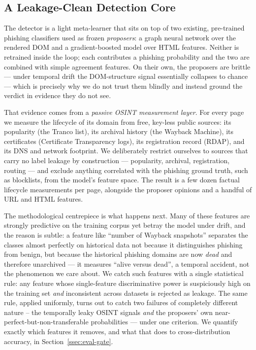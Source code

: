 \subsection{A Leakage-Clean Detection Core}
\label{ssec:core}

The detector is a light meta-learner that sits on top of two existing,
pre-trained phishing classifiers used as frozen \emph{proposers}: a graph
neural network over the rendered DOM and a gradient-boosted model over HTML
features. Neither is retrained inside the loop; each contributes a phishing
probability and the two are combined with simple agreement features. On their
own, the proposers are brittle --- under temporal drift the DOM-structure
signal essentially collapses to chance --- which is precisely why we do not
trust them blindly and instead ground the verdict in evidence they do not see.

That evidence comes from a \emph{passive OSINT measurement layer}. For every
page we measure the lifecycle of its domain from free, key-less public sources:
its popularity (the Tranco list), its archival history (the Wayback Machine),
its certificates (Certificate Transparency logs), its registration record
(RDAP), and its DNS and network footprint. We deliberately restrict ourselves
to sources that carry no label leakage by construction --- popularity,
archival, registration, routing --- and exclude anything correlated with the
phishing ground truth, such as blocklists, from the model's feature space. The
result is a few dozen factual lifecycle measurements per page, alongside the
proposer opinions and a handful of URL and HTML features.

The methodological centrepiece is what happens next. Many of these features are
strongly predictive on the training corpus yet betray the model under drift,
and the reason is subtle: a feature like ``number of Wayback snapshots''
separates the classes almost perfectly on historical data not because it
distinguishes phishing from benign, but because the historical phishing domains
are now \emph{dead} and therefore unarchived --- it measures ``alive versus
dead'', a temporal accident, not the phenomenon we care about. We catch such
features with a single statistical rule: any feature whose single-feature
discriminative power is suspiciously high on the training set \emph{and}
inconsistent across datasets is rejected as leakage. The same rule, applied
uniformly, turns out to catch two failures of completely different nature --
the temporally leaky OSINT signals \emph{and} the proposers' own
near-perfect-but-non-transferable probabilities --- under one criterion. We
quantify exactly which features it removes, and what that does to
cross-distribution accuracy, in Section~\ref{ssec:eval-gate}.

